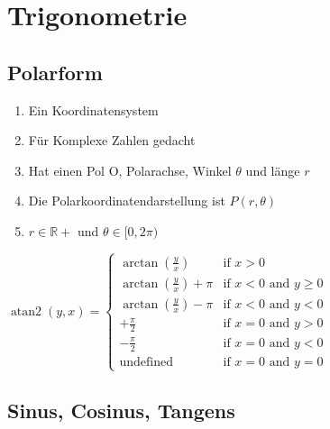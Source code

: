 \documentclass{article}
\begin{document}
\section*{Trigonometrie}

\subsection*{Polarform}

\begin{enumerate}[label=$\bullet$]
    \item Ein Koordinatensystem
    \item Für Komplexe Zahlen gedacht 
    \item Hat einen Pol O, Polarachse, Winkel $\theta$ und länge $r$
    \item Die Polarkoordinatendarstellung ist $P(r, \theta)$
    \item $r \in \mathbb{R}+$ und $\theta \in [0, 2\pi)$
\end{enumerate}



$\operatorname{atan2}(y,x) = \begin{cases}
    \arctan\left(\frac{y}{x}\right) & \text{if } x > 0 \\
    \arctan\left(\frac{y}{x}\right) + \pi & \text{if } x < 0 \text{ and } y \geq 0 \\
    \arctan\left(\frac{y}{x}\right) - \pi & \text{if } x < 0 \text{ and } y < 0 \\
    +\frac{\pi}{2} & \text{if } x = 0 \text{ and } y > 0 \\
    -\frac{\pi}{2} & \text{if } x = 0 \text{ and } y < 0 \\
    \text{undefined} & \text{if } x = 0 \text{ and } y = 0
\end{cases}$

\subsection*{Sinus, Cosinus, Tangens}
\end{document}
